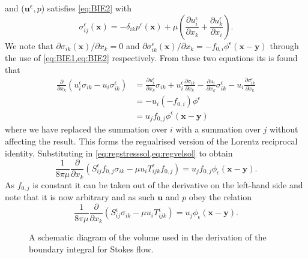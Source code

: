 and ($\bm{u^\epsilon},p$) satisfies \cref{eq:BIE2} with
\begin{equation*}
\sigma^\epsilon_{ij}(\bm{x}) = -\delta_{ik}p^\epsilon(\bm{x}) + \mu\left( \frac{\partial u^\epsilon_i}{\partial x_k} + \frac{\partial u^\epsilon_k}{\partial x_i} \right).
\end{equation*}
We note that $\partial \sigma_{ik}(\bm{x})/ \partial x_k = 0$ and $\partial \sigma^\epsilon_{ik}(\bm{x})/ \partial x_k = -f_{0,i}\phi^\epsilon(\bm{x}-\bm{y})$ through the use of \cref{eq:BIE1,eq:BIE2} respectively. From these two equations its is found that
\begin{equation*}
\begin{aligned}
  \frac{\partial}{\partial x_k}(u^\epsilon_i\sigma_{ik} - u_i\sigma^\epsilon_{ik}) &=
  \frac{\partial u^\epsilon_i}{\partial x_k} \sigma_{ik} + u^\epsilon_i\frac{\partial \sigma_{ik}}{\partial x_k} - \frac{\partial u_i}{\partial x_k} \sigma^\epsilon_{ik} - u_i\frac{\partial \sigma^\epsilon_{ik}}{\partial x_k}  \\
  & = - u_i(-f_{0,i})\phi^\epsilon  \\
  &= u_j f_{0,j}\phi^\epsilon(\bm{x}-\bm{y})
\end{aligned}
\end{equation*}
where we have replaced the summation over $i$ with a summation over $j$ without affecting the result. This forms the regualrised version of the Lorentz reciprocal identity. Substituting in \cref{eq:regstresssol,eq:regvelsol} to obtain
\begin{equation*}
  \frac{1}{8\pi\mu}\frac{\partial}{\partial x_k}(S^\epsilon_{ij}f_{0,j}\sigma_{ik} - \mu u_i T^\epsilon_{ijk}f_{0,j}) = u_j f_{0,j}\phi_\epsilon(\bm{x}-\bm{y}).
\end{equation*}
As $f_{0,j}$ is constant it can be taken out of the derivative on the left-hand side and note that it is now arbitrary and as such $\bm{u}$ and $p$ obey the relation
\begin{equation}
  \label{eq:reciprocalrelation}
  \frac{1}{8\pi\mu}\frac{\partial}{\partial x_k}(S^\epsilon_{ij}\sigma_{ik} - \mu u_i T^\epsilon_{ijk}) = u_j\phi_\epsilon(\bm{x}-\bm{y}).
\end{equation}

\begin{figure}
    \centering
    \resizebox{.35\linewidth}{!}{}
    \caption{A schematic diagram of the volume used in the derivation of the boundary integral for Stokes flow.}
    \label{fig:SystematicDiagram}
\end{figure}

